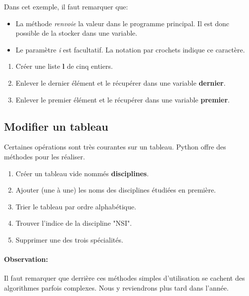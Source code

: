 \documentclass[a4paper,11pt]{article}
\begin{document}
\begin{Form}
Dans cet exemple, il faut remarquer que:
\begin{itemize}
\item La méthode \emph{renvoie} la valeur dans le programme principal. Il est donc possible de la stocker dans une variable.
\item Le paramètre \emph{i} est facultatif. La notation par crochets indique ce caractère.
\end{itemize}
\begin{activite}
\begin{enumerate}
\item Créer une liste \textbf{l} de cinq entiers.
\item Enlever le dernier élément et le récupérer dans une variable \textbf{dernier}.
\item Enlever le premier élément et le récupérer dans une variable \textbf{premier}.
\end{enumerate}
\end{activite}

\subsection{Modifier un tableau}
Certaines opérations sont très courantes sur un tableau. Python offre des méthodes pour les réaliser.
\begin{activite}
\begin{enumerate}
\item Créer un tableau vide nommés \textbf{disciplines}.
\item Ajouter (une à une) les noms des disciplines étudiées en première.
\item Trier le tableau par ordre alphabétique.
\item Trouver l'indice de la discipline "NSI".
\item Supprimer une des trois spécialités.
\end{enumerate}
\end{activite}
\paragraph{Observation:} Il faut remarquer que derrière ces méthodes simples d'utilisation se cachent des algorithmes parfois complexes. Nous y reviendrons plus tard dans l'année.

\end{Form}
\end{document}

